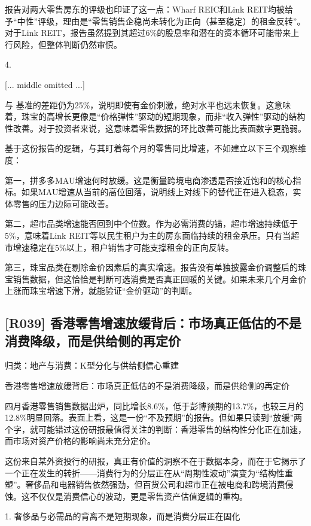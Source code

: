 \documentclass[11pt]{ctexart}
\begin{document}
报告对两大零售房东的评级也印证了这一点：Wharf REIC和Link REIT均被给予“中性”评级，理由是“零售销售企稳尚未转化为正向（甚至稳定）的租金反转”。对于Link REIT，报告虽然提到其超过6\%的股息率和潜在的资本循环可能带来上行风险，但整体判断仍然审慎。

4. 

[... middle omitted ...]

与 基准的差距仍为25\%，说明即使有金价刺激，绝对水平也远未恢复。这意味着，珠宝的高增长更像是“价格弹性”驱动的短期现象，而非“收入弹性”驱动的结构性改善。对于投资者来说，这意味着零售数据的环比改善可能比表面数字更脆弱。

基于这份报告的逻辑，与其盯着每个月的零售同比增速，不如建立以下三个观察维度：

第一，拼多多MAU增速何时放缓。这是衡量跨境电商渗透是否接近饱和的核心指标。如果MAU增速从当前的高位回落，说明线上对线下的替代正在进入稳态，实体零售的压力边际可能改善。

第二，超市品类增速能否回到中个位数。作为必需消费的锚，超市增速持续低于5\%，意味着Link REIT等以民生租户为主的房东面临持续的租金承压。只有当超市增速稳定在5\%以上，租户销售才可能支撑租金的正向反转。

第三，珠宝品类在剔除金价因素后的真实增速。报告没有单独披露金价调整后的珠宝销售数据，但这恰恰是判断可选消费是否真正回暖的关键。如果未来几个月金价上涨而珠宝增速下滑，就能验证“金价驱动”的判断。

\subsection{[R039] 香港零售增速放缓背后：市场真正低估的不是消费降级，而是供给侧的再定价}
{\small\color{refgray}归类：地产与消费：K型分化与供给侧信心重建}

香港零售增速放缓背后：市场真正低估的不是消费降级，而是供给侧的再定价

四月香港零售销售数据出炉，同比增长8.6\%，低于彭博预期的13.7\%，也较三月的12.8\%明显回落。表面上看，这是一份“不及预期”的报告。但如果只读到“放缓”两个字，就可能错过这份研报最值得关注的判断：香港零售的结构性分化正在加速，而市场对资产价格的影响尚未充分定价。

这份来自某外资投行的研报，真正有价值的洞察不在于数据本身，而在于它揭示了一个正在发生的转折——消费行为的分层正在从“周期性波动”演变为“结构性重塑”。奢侈品和电器销售依然强劲，但百货公司和超市正在被电商和跨境消费侵蚀。这不仅仅是消费信心的波动，更是零售资产估值逻辑的重构。

1. 奢侈品与必需品的背离不是短期现象，而是消费分层正在固化
\end{document}
